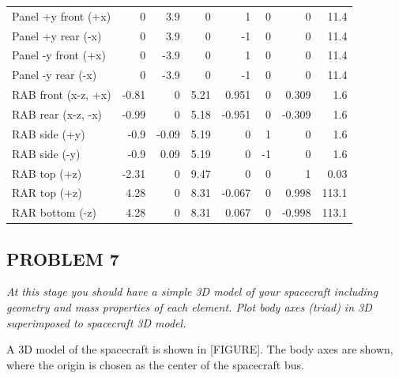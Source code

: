 \begin{longtable}{lrrrrrrr}
Panel +y front (+x)            & 0     & 3.9   & 0     & 1      & 0      & 0      & 11.4  \\
Panel +y rear (-x)             & 0     & 3.9   & 0     & -1     & 0      & 0      & 11.4  \\
Panel -y front (+x)            & 0     & -3.9  & 0     & 1      & 0      & 0      & 11.4  \\
Panel -y rear (-x)             & 0     & -3.9  & 0     & -1     & 0      & 0      & 11.4  \\
RAB front (x-z, +x)            & -0.81 & 0     & 5.21  & 0.951  & 0      & 0.309  & 1.6   \\
RAB rear (x-z, -x)             & -0.99 & 0     & 5.18  & -0.951 & 0      & -0.309 & 1.6   \\
RAB side (+y)                  & -0.9  & -0.09 & 5.19  & 0      & 1      & 0      & 1.6   \\
RAB side (-y)                  & -0.9  & 0.09  & 5.19  & 0      & -1     & 0      & 1.6   \\
RAB top (+z)                   & -2.31 & 0     & 9.47  & 0      & 0      & 1      & 0.03  \\
RAR top (+z)                   & 4.28  & 0     & 8.31  & -0.067 & 0      & 0.998  & 113.1 \\
RAR bottom (-z)                & 4.28  & 0     & 8.31  & 0.067  & 0      & -0.998 & 113.1
\end{longtable}

\subsection{PROBLEM 7}
\textit{At this stage you should have a simple 3D model of your spacecraft including geometry and mass properties of each element. Plot body axes (triad) in 3D superimposed to spacecraft 3D model.}

A 3D model of the spacecraft is shown in [FIGURE]. The body axes are shown, where the origin is chosen as the center of the spacecraft bus.

